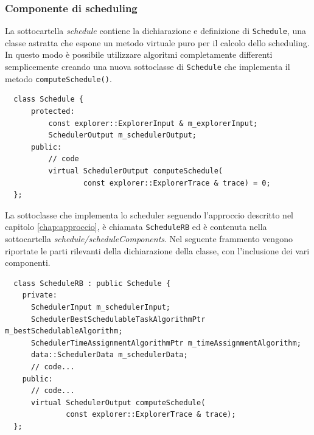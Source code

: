 \subsubsection{Componente di scheduling}
La sottocartella \emph{schedule} contiene la dichiarazione e definizione di
\verb+Schedule+, una classe astratta che espone un metodo virtuale puro per il 
calcolo dello scheduling. In questo modo è possibile utilizzare algoritmi 
completamente differenti semplicemente creando una nuova sottoclasse di 
\verb+Schedule+ che implementa il metodo \verb+computeSchedule()+.
\newline
\begin{verbatim}
  class Schedule {
      protected:
          const explorer::ExplorerInput & m_explorerInput;
          SchedulerOutput m_schedulerOutput;
      public:
          // code
          virtual SchedulerOutput computeSchedule(
                  const explorer::ExplorerTrace & trace) = 0;
  };
\end{verbatim}

La sottoclasse che implementa lo scheduler seguendo l'approccio descritto nel capitolo 
\ref{chap:approccio}, è chiamata \verb+ScheduleRB+ ed è contenuta nella 
sottocartella \emph{schedule/scheduleComponents}. Nel seguente frammento 
vengono riportate le parti rilevanti della dichiarazione della classe, con 
l'inclusione dei vari componenti.
\newline
\begin{verbatim}
  class ScheduleRB : public Schedule {
    private:
      SchedulerInput m_schedulerInput;
      SchedulerBestSchedulableTaskAlgorithmPtr m_bestSchedulableAlgorithm;
      SchedulerTimeAssignmentAlgorithmPtr m_timeAssignmentAlgorithm;
      data::SchedulerData m_schedulerData;
      // code...
    public:
      // code...
      virtual SchedulerOutput computeSchedule(
              const explorer::ExplorerTrace & trace);
  };
\end{verbatim}

